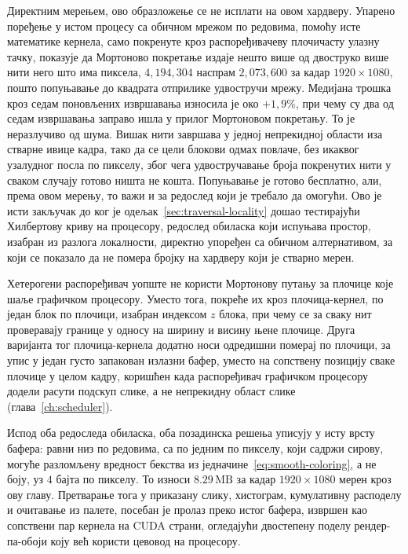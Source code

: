 \documentclass[serbian]{ftndiplomski}
\begin{document}
Директним мерењем, ово образложење се не исплати на овом хардверу. Упарено поређење у
истом процесу са обичном мрежом по редовима, помоћу исте математике кернела, само
покренуте кроз распоређивачеву плочичасту улазну тачку, показује да Мортоново
покретање издаје нешто више од двоструко више нити него што има пиксела,
$4{,}194{,}304$ наспрам $2{,}073{,}600$ за кадар $1920\times1080$, пошто попуњавање
до квадрата отприлике удвостручи мрежу. Медијана трошка кроз седам поновљених
извршавања износила је око $+1{,}9\%$, при чему су два од седам извршавања заправо
ишла у прилог Мортоновом покретању. То је неразлучиво од шума. Вишак нити завршава у
једној непрекидној области иза стварне ивице кадра, тако да се цели блокови одмах
повлаче, без икаквог узалудног посла по пикселу, због чега удвостручавање броја
покренутих нити у сваком случају готово ништа не кошта. Попуњавање је готово
бесплатно, али, према овом мерењу, то важи и за редослед који је требало да омогући.
Ово је исти закључак до ког је одељак~\ref{sec:traversal-locality} дошао тестирајући
Хилбертову криву на процесору, редослед обиласка који испуњава простор, изабран из
разлога локалности, директно упоређен са обичном алтернативом, за који се показало да
не помера бројку на хардверу који је стварно мерен.

Хетерогени распоређивач уопште не користи Мортонову путању за плочице које шаље
графичком процесору. Уместо тога, покреће их кроз плочица-кернел, по један блок по
плочици, изабран индексом $z$ блока, при чему се за сваку нит проверавају границе у
односу на ширину и висину њене плочице. Друга варијанта тог плочица-кернела
додатно носи одредишни померај по плочици, за упис у један густо запакован излазни
бафер, уместо на сопствену позицију сваке плочице у целом кадру, коришћен када
распоређивач графичком процесору додели расути подскуп слике, а не непрекидну област
слике (глава~\ref{ch:scheduler}).

Испод оба редоследа обиласка, оба позадинска решења уписују у исту врсту бафера:
равни низ по редовима, са по једним  по пикселу, који садржи сирову, могуће
разломљену вредност бекства из једначине~\ref{eq:smooth-coloring}, а не боју, уз $4$
бајта по пикселу. То износи $8.29\,\mathrm{MB}$ за кадар $1920\times1080$ мерен кроз
ову главу. Претварање тога у приказану слику, хистограм, кумулативну расподелу и
очитавање из палете, посебан је пролаз преко истог бафера, извршен као сопствени
пар кернела на CUDA страни, огледајући двостепену поделу рендер-па-обоји коју већ
користи цевовод на процесору.
\end{document}
